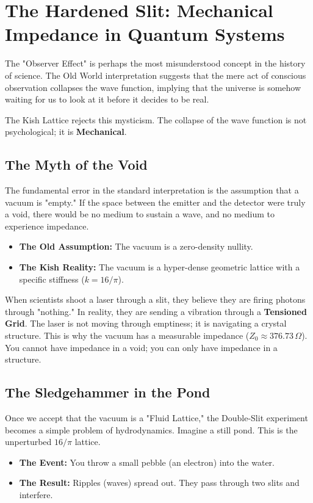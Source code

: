 \documentclass[11pt, letterpaper, openany]{book}
\begin{document}
\chapter{The Hardened Slit: Mechanical Impedance in Quantum Systems}
\label{ch:double_slit}

The "Observer Effect" is perhaps the most misunderstood concept in the history of science. The Old World interpretation suggests that the mere act of conscious observation collapses the wave function, implying that the universe is somehow waiting for us to look at it before it decides to be real.

The Kish Lattice rejects this mysticism. The collapse of the wave function is not psychological; it is \textbf{Mechanical}.

\section{The Myth of the Void}
The fundamental error in the standard interpretation is the assumption that a vacuum is "empty."
If the space between the emitter and the detector were truly a void, there would be no medium to sustain a wave, and no medium to experience impedance.
\begin{itemize}
    \item \textbf{The Old Assumption:} The vacuum is a zero-density nullity.
    \item \textbf{The Kish Reality:} The vacuum is a hyper-dense geometric lattice with a specific stiffness ($k = 16/\pi$).
\end{itemize}

When scientists shoot a laser through a slit, they believe they are firing photons through "nothing." In reality, they are sending a vibration through a \textbf{Tensioned Grid}. The laser is not moving through emptiness; it is navigating a crystal structure. This is why the vacuum has a measurable impedance ($Z_0 \approx 376.73 \, \Omega$). You cannot have impedance in a void; you can only have impedance in a structure.

\section{The Sledgehammer in the Pond}
Once we accept that the vacuum is a "Fluid Lattice," the Double-Slit experiment becomes a simple problem of hydrodynamics. 
Imagine a still pond. This is the unperturbed $16/\pi$ lattice.
\begin{itemize}
    \item \textbf{The Event:} You throw a small pebble (an electron) into the water.
    \item \textbf{The Result:} Ripples (waves) spread out. They pass through two slits and interfere.
\end{itemize}
\end{document}
